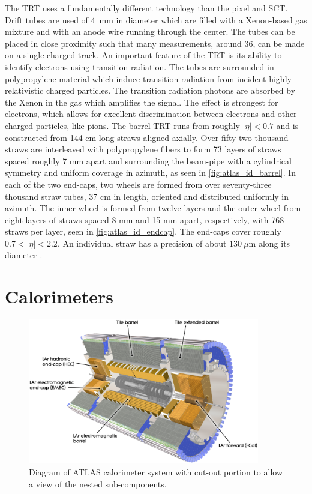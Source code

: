The TRT uses a fundamentally different technology 
than the pixel and SCT.
Drift tubes are used of 4~mm in diameter 
which are filled with a Xenon-based gas mixture
and with an anode wire running through the center.
The tubes can be placed in close
proximity such that many measurements, around 36,
can be made on a single charged track. An important feature
of the TRT is its ability to identify electrons using transition radiation.
The tubes are surrounded in polypropylene material which  induce
transition radiation from incident highly relativistic charged particles.
The transition radiation photons are absorbed by the Xenon in the gas
which amplifies the signal. The effect is strongest for electrons, 
which allows for excellent discrimination between electrons
and other charged particles, like pions.
The barrel TRT runs from roughly $|\eta|<0.7$ and
is constructed from 144 cm long straws aligned
axially. Over fifty-two thousand straws are interleaved
with polypropylene fibers to form 73 layers of straws 
spaced roughly 7 mm apart and surrounding the beam-pipe with
a cylindrical symmetry and uniform coverage in azimuth,
as seen in \fig\ref{fig:atlas_id_barrel}.
In each of the two end-caps, two wheels are formed from over seventy-three
thousand straw tubes, 37 cm in length, 
oriented and distributed uniformly in azimuth. 
The inner wheel is formed from twelve layers and the outer wheel from eight
layers of straws spaced 8 mm and 15 mm apart, respectively,  
with 768 straws per layer, seen in \fig\ref{fig:atlas_id_endcap}.
The end-caps cover roughly $0.7<|\eta|<2.2$.
An individual straw has a precision of about $130~\mu\textrm{m}$ along
its diameter \cite{ATLAS-CONF-2014-047}.




\section{Calorimeters }
\begin{figure}[ht]
\centering
\includegraphics[width=0.9\textwidth]{figures/atlas/calorimeter.eps}
\caption{Diagram of ATLAS calorimeter system with cut-out portion
to allow a view of the nested sub-components.}
\label{fig:atlas_calorimeter}
\end{figure}


